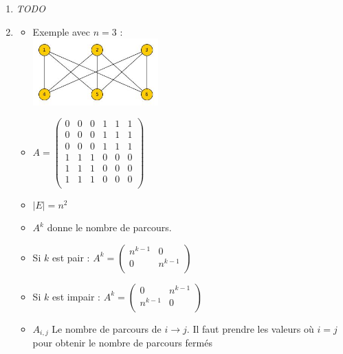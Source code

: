 \begin{solution}
\begin{enumerate}
    \item \emph{TODO}
\item
	\begin{itemize}
	\item Exemple avec $n=3$ :\\
	\includegraphics[width=0.4\textwidth]{graph_ape1_ex4}
	\item
	 $A = \begin{pmatrix}
	 0&0&0&1&1&1\\
	 0&0&0&1&1&1\\
	 0&0&0&1&1&1\\
	 1&1&1&0&0&0\\
	 1&1&1&0&0&0\\
	 1&1&1&0&0&0\\
	 \end{pmatrix}$

	\item $|E| = n^{2}$

	\item $A^{k} $ donne le nombre de parcours.
	\item Si $k$ est pair :
	 $A^{k} =  \left(
	 \begin{array}{c|c}
	 n^{k-1} & 0\\
	 \hline
	 0 & n^{k-1}\\
	 \end{array}
	 \right)
	 $
	\item Si $k$ est impair :
	 $A^{k} =  \left(
	 \begin{array}{c|c}
	 0 & n^{k-1}\\
	 \hline
	 n^{k-1}&0\\
	 \end{array}
	 \right)
	 $
	\item $A_{i,j}$ Le nombre de parcours de $i \rightarrow j$. Il faut prendre les valeurs où $i = j$ pour obtenir le nombre de parcours fermés
\end{itemize}
\end{enumerate}
\end{solution}

